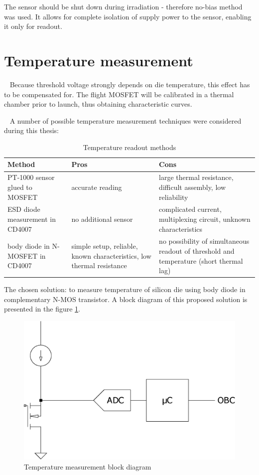     The sensor should be shut down during irradiation - therefore no-bias method was used. It allows for complete isolation of supply power to the sensor, enabling it only for readout.

\section{Temperature measurement}
    Because threshold voltage strongly depends on die temperature, this effect has to be compensated for. The flight MOSFET will be calibrated in a thermal chamber prior to launch, thus obtaining characteristic curves.

    A number of possible temperature measurement techniques were considered during this thesis:
    \begin{table}[H]
    \caption{Temperature readout methods}
    \begin{tabular}{R{4.5cm} | C{5cm} | C{5cm} }
        \textbf{Method} & \textbf{Pros} & \textbf{Cons} \\ \hline

        PT-1000 sensor glued to MOSFET & accurate reading & large thermal resistance, difficult assembly, low reliability \\ \hline

        ESD diode measurement in CD4007 & no additional sensor & complicated current, multiplexing circuit, unknown characteristics \\ \hline

        body diode in N-MOSFET in CD4007  & simple setup, reliable, known characteristics, low thermal resistance & no possibility of simultaneous readout of threshold and temperature (short thermal lag)
    \end{tabular}
    \end{table}

    The chosen solution: to measure temperature of silicon die using body diode in complementary N-MOS transistor. A block diagram of this proposed solution is presented in the figure \ref{Temperature_measurement_block_diagram}.

    \begin{figure}[H]
        \centering
        \includegraphics[width=0.5\paperwidth]{img/05/n-mos-temperature.eps}
        \caption{Temperature measurement block diagram}
        \label{Temperature_measurement_block_diagram}
    \end{figure}

